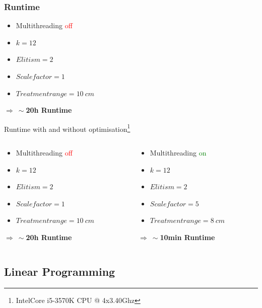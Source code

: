 \documentclass{beamer}
\begin{document}
\begin{frame}
\frametitle{Runtime}

\begin{itemize}
\item Multithreading \textcolor{red}{off}
\item $k = 12$
\item $Elitism = 2$
\item $Scalefactor = 1$
\item $Treatmentrange = 10 \ cm$
\end{itemize}

 \textbf{$\Rightarrow \ \sim $20h Runtime} 
 


\end{frame}

\begin{frame}

Runtime with and without optimisation\footnote{Intel\textregistered  Core i5-3570K CPU @ 4x3.40Ghz}
\begin{columns}[T] %
\begin{column}{.48\textwidth}
\begin{itemize}
\item Multithreading \textcolor{red}{off}
\item $k = 12$
\item $Elitism = 2$
\item $Scalefactor = 1$
\item $Treatmentrange = 10 \ cm$
\end{itemize}

 \textbf{$\Rightarrow \ \sim $20h Runtime}
\end{column}%
\hfill%

\begin{column}{.48\textwidth}
\begin{itemize}
\item Multithreading \textcolor{green}{on}
\item $k = 12$
\item $Elitism = 2$
\item $Scalefactor = 5$
\item $Treatmentrange = 8 \ cm$
\end{itemize}

 \textbf{$\Rightarrow \ \sim $10min Runtime}
\end{column}%
\end{columns}
\end{frame}
 
 \subsection{Linear Programming}
 \frame{\tableofcontents[currentsubsection]}
\end{document}
